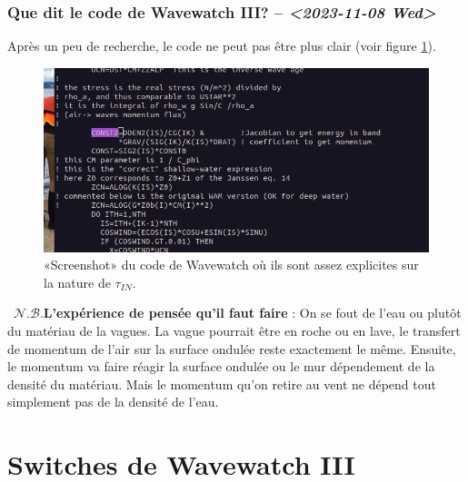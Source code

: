 \documentclass[10pt]{article}
\numberwithin{equation}{section}
\newcommand{\nb}{\raisebox{0.8pt}{\scriptsize\textleaf}\ $\mathscr{N. B.}$\hspace{4pt}}
\begin{document}
\subsubsection{Que dit le code de Wavewatch III? -- \textit{<2023-11-08 Wed>}}
\label{sec:org05e23be}

Après un peu de recherche, le code ne peut pas être plus clair (voir figure \ref{fig:org86f4cc3}). 

\begin{figure}[htbp]
\centering
\includegraphics[width=.9\linewidth]{figures/articles/Screenshot from 2023-11-08 15-59-22.png}
\caption{\label{fig:org86f4cc3}«Screenshot» du code de Wavewatch où ils sont assez explicites sur la nature de \(\tau_{IN}\).}
\end{figure}


\nb \textbf{L'expérience de pensée qu'il faut faire} : On se fout de l'eau ou plutôt du matériau de la vagues.
La vague pourrait être en roche ou en lave, le transfert de momentum de l'air sur la surface ondulée reste exactement le même.
Ensuite, le momentum va faire réagir la surface ondulée ou le mur dépendement de la densité du matériau.
Mais le momentum qu'on retire au vent ne dépend tout simplement pas de la densité de l'eau. \bigskip

\section{Switches de Wavewatch III}
\label{sec:orgfb9553f}


\end{document}
